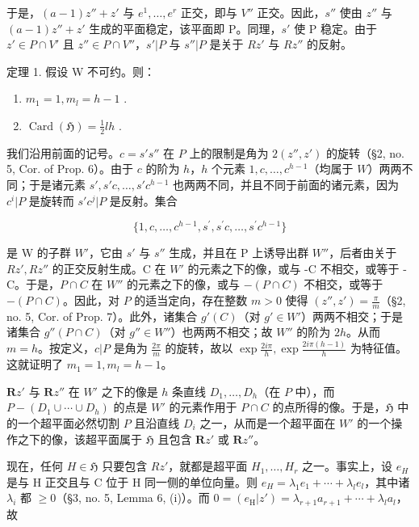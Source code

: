 于是，\((a-1)z'' + z'\) 与 \(e^{1}, \ldots, e^{r}\) 正交，即与 \(V''\) 正交。因此，\(s''\) 使由 \(z''\) 与 \((a-1)z'' + z'\) 生成的平面稳定，该平面即 P。同理，\(s'\) 使 P 稳定。由于 \(z' \in P \cap V'\) 且 \(z'' \in P \cap V''\)，\(s'|P\) 与 \(s''|P\) 是关于 \(Rz'\) 与 \(Rz''\) 的反射。

定理 1. 假设 W 不可约。则：

\begin{enumerate}
\def\labelenumi{(\roman{enumi})}
\item
  \(m_{1} = 1, m_{l} = h - 1\) .
\item
  \(\operatorname{Card}(\mathfrak{H}) = \frac{1}{2} lh\) .
\end{enumerate}

我们沿用前面的记号。\(c = s's''\) 在 \(P\) 上的限制是角为 \(2(z'', z')\) 的旋转（§2, no. 5, Cor. of Prop. 6）。由于 \(c\) 的阶为 \(h\)，\(h\) 个元素 \(1, c, \ldots, c^{h-1}\)（均属于 \(W\)）两两不同；于是诸元素 \(s', s'c, \ldots, s'c^{h-1}\) 也两两不同，并且不同于前面的诸元素，因为 \(c^i |P\) 是旋转而 \(s'c^j |P\) 是反射。集合

\[
\{1, c, \dots , c ^ {h - 1}, s ^ {\prime}, s ^ {\prime} c, \dots , s ^ {\prime} c ^ {h - 1} \}
\]

是 W 的子群 \(W'\)，它由 \(s'\) 与 \(s''\) 生成，并且在 P 上诱导出群 \(W''\)，后者由关于 \(Rz', Rz''\) 的正交反射生成。C 在 \(W'\) 的元素之下的像，或与 -C 不相交，或等于 -C。于是，\(P \cap C\) 在 \(W''\) 的元素之下的像，或与 \(-(P \cap C)\) 不相交，或等于 \(-(P \cap C)\)。因此，对 \(P\) 的适当定向，存在整数 \(m > 0\) 使得 \((z'', z') = \frac{\pi}{m}\)（§2, no. 5, Cor. of Prop. 7）。此外，诸集合 \(g'(C)\)（对 \(g' \in W'\)）两两不相交；于是诸集合 \(g''(P \cap C)\)（对 \(g'' \in W''\)）也两两不相交；故 \(W''\) 的阶为 \(2h\)。从而 \(m = h\)。按定义，\(c|P\) 是角为 \(\frac{2\pi}{m}\) 的旋转，故以 \(\exp \frac{2i\pi}{h}, \exp \frac{2i\pi(h - 1)}{h}\) 为特征值。这就证明了 \(m_1 = 1, m_l = h - 1\)。

\(\mathbf{R}z'\) 与 \(\mathbf{R}z''\) 在 \(W'\) 之下的像是 \(h\) 条直线 \(D_1, \ldots, D_h\)（在 \(P\) 中），而 \(P - (D_1 \cup \cdots \cup D_h)\) 的点是 \(W'\) 的元素作用于 \(P \cap C\) 的点所得的像。于是，\(\mathfrak{H}\) 中的一个超平面必然切割 \(P\) 且沿直线 \(D_i\) 之一，从而是一个超平面在 \(W'\) 的一个操作之下的像，该超平面属于 \(\mathfrak{H}\) 且包含 \(\mathbf{R}z'\) 或 \(\mathbf{R}z''\)。

现在，任何 \(H \in \mathfrak{H}\) 只要包含 \(Rz'\)，就都是超平面 \(H_{1}, \ldots, H_{r}\) 之一。事实上，设 \(e_{H}\) 是与 H 正交且与 C 位于 H 同一侧的单位向量。则 \(e_{H} = \lambda_{1}e_{1} + \cdots + \lambda_{l}e_{l}\)，其中诸 \(\lambda_{i}\) 都 \(\geqslant 0\)（§3, no. 5, Lemma 6, (i)）。而 \(0 = (e_{\mathrm{H}}|z') = \lambda_{r+1}a_{r+1} + \cdots + \lambda_{l}a_{l}\)，故

